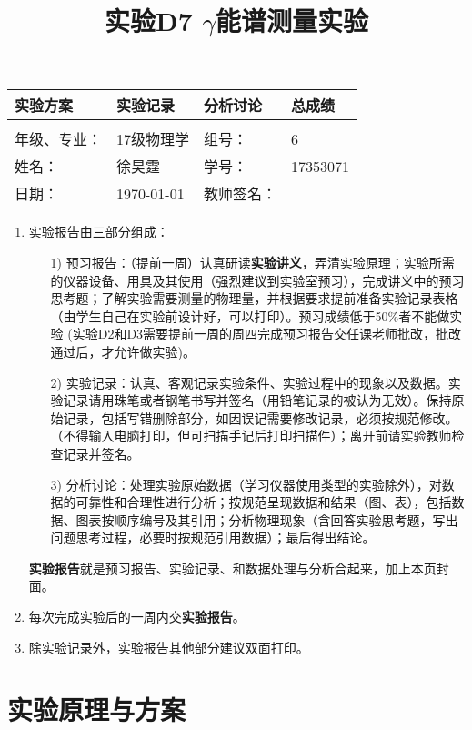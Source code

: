 \documentclass[11pt,a4paper]{ctexart}
\title{实验D7 $\gamma$能谱测量实验}
\begin{document}
\maketitle
\begin{tabular}{|p{8em}|p{9em}|p{8em}|p{5em}|}
\hline
		实验方案 &实验记录  &分析讨论 &总成绩\\
		\hline
		        &          &          &  \\
	    \hline
	\hline 
	年级、专业： &17级物理学 &组号：& 6 \\
	\hline
	姓名：& 徐昊霆 &学号：&17353071  \\
	\hline
	日期：& \today &教师签名： &  \\
    \hline	
\end{tabular}
    \begin{enumerate}
 \item 实验报告由三部分组成：
 \begin{enumerate}
  \item[1)]预习报告：（提前一周）认真研读\textbf{\uline{实验讲义}}，弄清实验原理；实验所需的仪器设备、用具及其使用（强烈建议到实验室预习），完成讲义中的预习思考题；了解实验需要测量的物理量，并根据要求提前准备实验记录表格（由学生自己在实验前设计好，可以打印）。预习成绩低于50\%者不能做实验{\color{red} (实验D2和D3需要提前一周的周四完成预习报告交任课老师批改，批改通过后，才允许做实验)}。

  \item[2)]实验记录：认真、客观记录实验条件、实验过程中的现象以及数据。实验记录请用珠笔或者钢笔书写并签名（{\color{red}用铅笔记录的被认为无效}）。{\color{red}保持原始记录，包括写错删除部分，如因误记需要修改记录，必须按规范修改。}（不得输入电脑打印，但可扫描手记后打印扫描件）；离开前请实验教师检查记录并签名。
  \item[3)]分析讨论：处理实验原始数据（学习仪器使用类型的实验除外），对数据的可靠性和合理性进行分析；按规范呈现数据和结果（图、表），包括数据、图表按顺序编号及其引用；分析物理现象（含回答实验思考题，写出问题思考过程，必要时按规范引用数据）；最后得出结论。
 \end{enumerate}
 \textbf{实验报告}就是预习报告、实验记录、和数据处理与分析合起来，加上本页封面。
 \item 每次完成实验后的一周内交\textbf{实验报告}。
 \item 除实验记录外，实验报告其他部分建议双面打印。
\end{enumerate}

    
\newpage
\tableofcontents
\newpage
\section{实验原理与方案}
\end{document}
